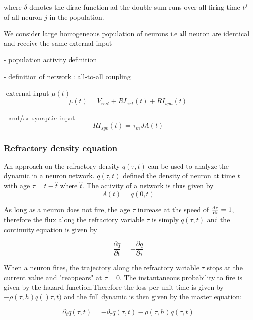 \documentclass[a4paper,11pt,twoside]{article}
\def \dd  {{\rm d}}
\numberwithin{equation}{section}
\begin{document}
where $\delta$ denotes the dirac function ad the double sum runs over all firing time $t^f$ of all neuron $j$ in the population.

We consider large homogeneous population of neurons i.e all neuron are identical and receive the same external input


 



- population activity definition

- definition of network : all-to-all coupling

-external input $\mu(t)$
\begin{equation}
\label{eq:mu}
\mu(t)=V_{rest}+RI_{ext}(t)+RI_{syn}(t)
\end{equation}

- and/or synaptic input
\begin{equation}
\label{eq:input}
RI_{syn}(t)=\tau_mJA(t)
\end{equation}

\subsubsection{Refractory density equation}

An approach on the refractory density $q(\tau,t) $ can be used to analyze the dynamic in a neuron network. $q(\tau,t)$ defined the density of neuron at time $t$ with age $\tau=t-\hat{t}$ where $\hat{t}$. The activity of a network is thus given by
\begin{equation}
\label{eq:A}
A(t)=q(0,t)
\end{equation}

As long as a neuron does not fire, the age $\tau$ increase at the speed of $\frac{\dd \tau}{\dd t}=1$, therefore the flux along the refractory variable $\tau$ is simply $q(\tau,t)$ and the continuity equation  is given by

\begin{equation}
\label{eq:continuity1}
\frac{\partial q}{\partial t}=-\frac{\partial q}{\partial \tau}
\end{equation}

When a neuron fires, the trajectory along the refractory variable $\tau$ stops at the current value and "reappears" at $\tau=0$. The instantaneous probability to fire is given by the hazard function.Therefore the loss per unit time is given by $-\rho(\tau,h)q()\tau,t)$ and the full dynamic is then given by the master equation:

\begin{equation}
\label{eq:masterequation}
\partial_t q(\tau,t)=-\partial_\tau q(\tau,t)-\rho(\tau,h)q(\tau,t)
\end{equation}
\end{document}
